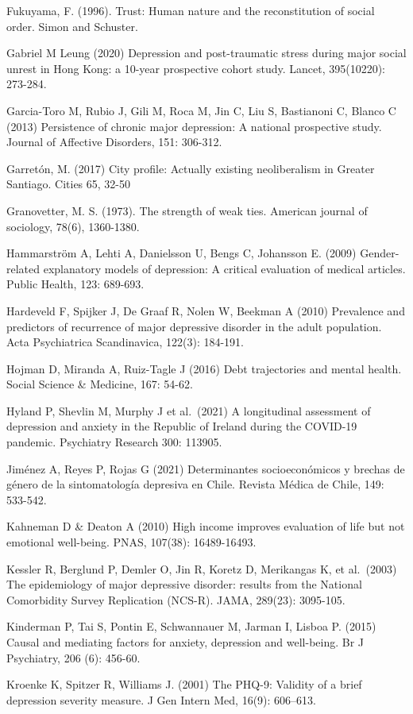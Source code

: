 \documentclass[
  12pt,
]{book}
\begin{document}
Fukuyama, F. (1996). Trust: Human nature and the reconstitution of social order. Simon and Schuster.

Gabriel M Leung (2020) Depression and post-traumatic stress during major social unrest in Hong Kong: a 10-year prospective cohort study. Lancet, 395(10220): 273-284.

Garcia-Toro M, Rubio J, Gili M, Roca M, Jin C, Liu S, Bastianoni C, Blanco C (2013) Persistence of chronic major depression: A national prospective study. Journal of Affective Disorders, 151: 306-312.

Garretón, M. (2017) City profile: Actually existing neoliberalism in Greater Santiago. Cities 65, 32-50

Granovetter, M. S. (1973). The strength of weak ties. American journal of sociology, 78(6), 1360-1380.

Hammarström A, Lehti A, Danielsson U, Bengs C, Johansson E. (2009) Gender-related explanatory models of depression: A critical evaluation of medical articles. Public Health, 123: 689-693.

Hardeveld F, Spijker J, De Graaf R, Nolen W, Beekman A (2010) Prevalence and predictors of recurrence of major depressive disorder in the adult population. Acta Psychiatrica Scandinavica, 122(3): 184-191.

Hojman D, Miranda A, Ruiz-Tagle J (2016) Debt trajectories and mental health. Social Science \& Medicine, 167: 54-62.

Hyland P, Shevlin M, Murphy J et al.~(2021) A longitudinal assessment of depression and anxiety in the Republic of Ireland during the COVID-19 pandemic. Psychiatry Research 300: 113905.

Jiménez A, Reyes P, Rojas G (2021) Determinantes socioeconómicos y brechas de género de la sintomatología depresiva en Chile. Revista Médica de Chile, 149: 533-542.

Kahneman D \& Deaton A (2010) High income improves evaluation of life but not emotional well-being. PNAS, 107(38): 16489-16493.

Kessler R, Berglund P, Demler O, Jin R, Koretz D, Merikangas K, et al.~(2003) The epidemiology of major depressive disorder: results from the National Comorbidity Survey Replication (NCS-R). JAMA, 289(23): 3095-105.

Kinderman P, Tai S, Pontin E, Schwannauer M, Jarman I, Lisboa P. (2015) Causal and mediating factors for anxiety, depression and well-being. Br J Psychiatry, 206 (6): 456-60.

Kroenke K, Spitzer R, Williams J. (2001) The PHQ-9: Validity of a brief depression severity measure. J Gen Intern Med, 16(9): 606--613.
\end{document}
